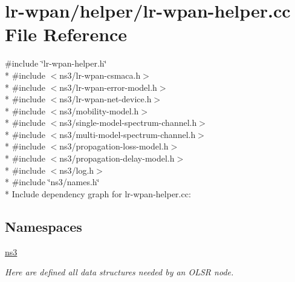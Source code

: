 \hypertarget{lr-wpan-helper_8cc}{}\section{lr-\/wpan/helper/lr-\/wpan-\/helper.cc File Reference}
\label{lr-wpan-helper_8cc}
{\ttfamily \#include \char`\"{}lr-\/wpan-\/helper.\+h\char`\"{}}\\*
{\ttfamily \#include $<$ns3/lr-\/wpan-\/csmaca.\+h$>$}\\*
{\ttfamily \#include $<$ns3/lr-\/wpan-\/error-\/model.\+h$>$}\\*
{\ttfamily \#include $<$ns3/lr-\/wpan-\/net-\/device.\+h$>$}\\*
{\ttfamily \#include $<$ns3/mobility-\/model.\+h$>$}\\*
{\ttfamily \#include $<$ns3/single-\/model-\/spectrum-\/channel.\+h$>$}\\*
{\ttfamily \#include $<$ns3/multi-\/model-\/spectrum-\/channel.\+h$>$}\\*
{\ttfamily \#include $<$ns3/propagation-\/loss-\/model.\+h$>$}\\*
{\ttfamily \#include $<$ns3/propagation-\/delay-\/model.\+h$>$}\\*
{\ttfamily \#include $<$ns3/log.\+h$>$}\\*
{\ttfamily \#include \char`\"{}ns3/names.\+h\char`\"{}}\\*
Include dependency graph for lr-\/wpan-\/helper.cc\+:
\subsection*{Namespaces}
\begin{DoxyCompactItemize}
\item 
 \hyperlink{namespacens3}{ns3}
\begin{DoxyCompactList}\small\item\em Here are defined all data structures needed by an O\+L\+SR node. \end{DoxyCompactList}\end{DoxyCompactItemize}
